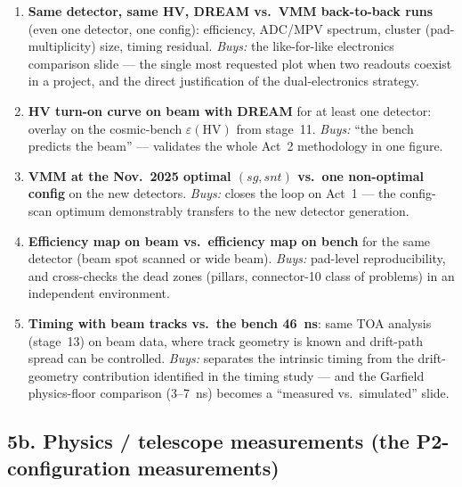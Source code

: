 \documentclass[11pt,a4paper]{article}
\begin{document}
\begin{enumerate}[itemsep=2pt]
  \item \textbf{Same detector, same HV, DREAM vs.\ VMM back-to-back runs}
    (even one detector, one config): efficiency, ADC/MPV spectrum, cluster
    (pad-multiplicity) size, timing residual. \emph{Buys:} the like-for-like
    electronics comparison slide --- the single most requested plot when two
    readouts coexist in a project, and the direct justification of the
    dual-electronics strategy.
  \item \textbf{HV turn-on curve on beam with DREAM} for at least one
    detector: overlay on the cosmic-bench $\varepsilon(\mathrm{HV})$ from
    stage~11. \emph{Buys:} ``the bench predicts the beam'' --- validates the
    whole Act~2 methodology in one figure.
  \item \textbf{VMM at the Nov.\ 2025 optimal $(sg, snt)$ vs.\ one
    non-optimal config} on the new detectors. \emph{Buys:} closes the loop on
    Act~1 --- the config-scan optimum demonstrably transfers to the new
    detector generation.
  \item \textbf{Efficiency map on beam vs.\ efficiency map on bench} for the
    same detector (beam spot scanned or wide beam). \emph{Buys:} pad-level
    reproducibility, and cross-checks the dead zones (pillars, connector-10
    class of problems) in an independent environment.
  \item \textbf{Timing with beam tracks vs.\ the bench 46~ns}: same TOA
    analysis (stage~13) on beam data, where track geometry is known and
    drift-path spread can be controlled. \emph{Buys:} separates the intrinsic
    timing from the drift-geometry contribution identified in the timing
    study --- and the Garfield physics-floor comparison (3--7~ns) becomes a
    ``measured vs.\ simulated'' slide.
\end{enumerate}

\subsection*{5b. Physics / telescope measurements (the P2-configuration measurements)}
\end{document}
